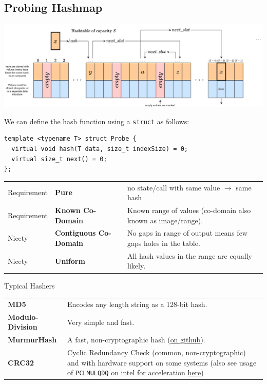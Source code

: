 \subsection{Probing Hashmap}
\begin{center}
    \includegraphics[width=.9\textwidth]{algorithms_and_indices/images/hash_table.drawio.png}
\end{center}
We can define the hash function using a \texttt{struct} as follows:
\begin{verbatim}
template <typename T> struct Probe {
  virtual void hash(T data, size_t indexSize) = 0;
  virtual size_t next() = 0;
};
\end{verbatim}
\begin{center}
    \begin{tabular}{l l p{}}
        Requirement & \textbf{Pure} & no state/call with same value $\to$ same hash \\
        Requirement & \textbf{Known Co-Domain} & Known range of values (co-domain also known as image/range). \\
        Nicety & \textbf{Contiguous Co-Domain} & No gaps in range of output means few gaps holes in the table. \\
        Nicety & \textbf{Uniform} & All hash values in the range are equally likely. \\
    \end{tabular}
\end{center}
\begin{sidenotebox}{Typical Hashers}
    \begin{center}
        \begin{tabular}{l p{}}
            \textbf{MD5} & Encodes any length string as a 128-bit hash. \\
            \textbf{Modulo-Division} & Very simple and fast. \\
            \textbf{MurmurHash} & A fast, non-cryptographic hash (\href{https://github.com/aappleby/smhasher}{on github}). \\
            \textbf{CRC32} & Cyclic Redundancy Check (common, non-cryptographic) and with hardware support on some systems (also see usage of \texttt{PCLMULQDQ} on intel for acceleration \href{https://www.intel.com/content/dam/www/public/us/en/documents/white-papers/fast-crc-computation-generic-polynomials-pclmulqdq-paper.pdf}{here})
        \end{tabular}
    \end{center}
\end{sidenotebox}
